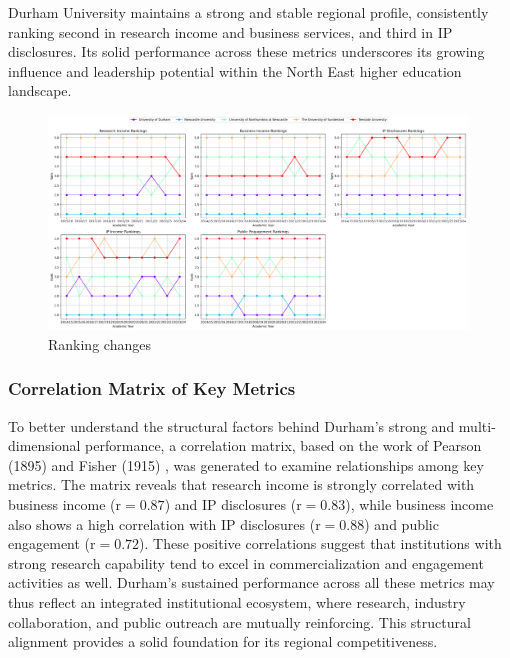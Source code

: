 \documentclass[journal,onecolumn, 10pt,draftclsnofoot]{IEEEtran}
\begin{document}
Durham University maintains a strong and stable regional profile, consistently ranking second in research income and business services, and third in IP disclosures. Its solid performance across these metrics underscores its growing influence and leadership potential within the North East higher education landscape.


\begin{figure}[h]
\centering
\includegraphics[width=0.99\textwidth]{Fig/figure35.ranking_changes.png}
\caption{Ranking changes}
\label{fig:ranking-changes}
\end{figure}

\subsubsection{Correlation Matrix of Key Metrics}

To better understand the structural factors behind Durham's strong and multi-dimensional performance, a correlation matrix, based on the work of Pearson (1895) \cite{pearson1895notes} and Fisher (1915) \cite{fisher1915frequency}, was generated to examine relationships among key metrics. The matrix reveals that research income is strongly correlated with business income ($\mathrm{r}=0.87$) and IP disclosures ($\mathrm{r}=0.83$), while business income also shows a high correlation with IP disclosures ($\mathrm{r}=0.88$) and public engagement ($\mathrm{r}=0.72$). These positive correlations suggest that institutions with strong research capability tend to excel in commercialization and engagement activities as well. Durham's sustained performance across all these metrics may thus reflect an integrated institutional ecosystem, where research, industry collaboration, and public outreach are mutually reinforcing. This structural alignment provides a solid foundation for its regional competitiveness.
\end{document}
